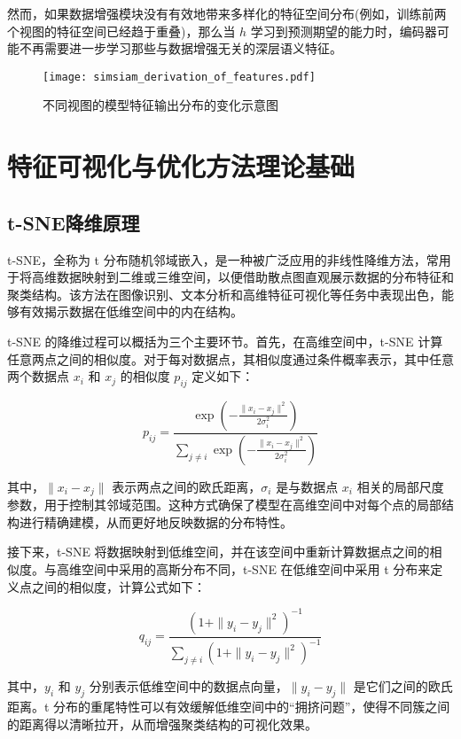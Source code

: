 \documentclass[master]{thesis-uestc}
\begin{document}
然而，如果数据增强模块没有有效地带来多样化的特征空间分布(例如，训练前两个视图的特征空间已经趋于重叠)，那么当 \( h \) 学习到预测期望的能力时，编码器可能不再需要进一步学习那些与数据增强无关的深层语义特征。

\begin{figure}[h]
    \centering
    \texttt{[image: simsiam\_derivation\_of\_features.pdf]}
    \caption{不同视图的模型特征输出分布的变化示意图}
    \label{simsiam_derivation_of_features}
\end{figure}

\section{特征可视化与优化方法理论基础}
\subsection{t-SNE降维原理}
t-SNE，全称为 t 分布随机邻域嵌入，是一种被广泛应用的非线性降维方法，常用于将高维数据映射到二维或三维空间，以便借助散点图直观展示数据的分布特征和聚类结构。该方法在图像识别、文本分析和高维特征可视化等任务中表现出色，能够有效揭示数据在低维空间中的内在结构。

t-SNE 的降维过程可以概括为三个主要环节。首先，在高维空间中，t-SNE 计算任意两点之间的相似度。对于每对数据点，其相似度通过条件概率表示，其中任意两个数据点 \(x_i\) 和 \(x_j\) 的相似度 \(p_{ij}\) 定义如下：

\begin{equation}
p_{ij} = \frac{\exp\left( -\frac{\|x_i - x_j\|^2}{2\sigma_i^2} \right)}{\sum_{j \neq i} \exp\left( -\frac{\|x_i - x_j\|^2}{2\sigma_i^2} \right)}
\end{equation}

其中，\(\|x_i - x_j\|\) 表示两点之间的欧氏距离，\(\sigma_i\) 是与数据点 \(x_i\) 相关的局部尺度参数，用于控制其邻域范围。这种方式确保了模型在高维空间中对每个点的局部结构进行精确建模，从而更好地反映数据的分布特性。

接下来，t-SNE 将数据映射到低维空间，并在该空间中重新计算数据点之间的相似度。与高维空间中采用的高斯分布不同，t-SNE 在低维空间中采用 t 分布来定义点之间的相似度，计算公式如下：

\begin{equation}
q_{ij} = \frac{\left( 1 + \|y_i - y_j\|^2 \right)^{-1}}{\sum_{j \neq i} \left( 1 + \|y_i - y_j\|^2 \right)^{-1}}
\end{equation}

其中，\(y_i\) 和 \(y_j\) 分别表示低维空间中的数据点向量，\(\|y_i - y_j\|\) 是它们之间的欧氏距离。t 分布的重尾特性可以有效缓解低维空间中的“拥挤问题”，使得不同簇之间的距离得以清晰拉开，从而增强聚类结构的可视化效果。
\end{document}
